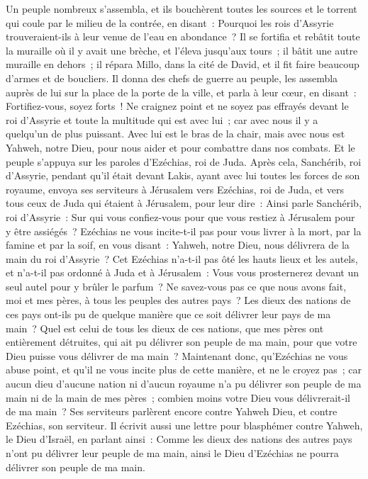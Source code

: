 \begin{multicols}{2}
Un peuple nombreux s'assembla, et ils bouchèrent toutes les sources et le torrent qui coule par le milieu de la contrée, en disant~: Pourquoi les rois d'Assyrie trouveraient-ils à leur venue de l'eau en abondance~?
Il se fortifia et rebâtit toute la muraille où il y avait une brèche, et l'éleva jusqu'aux tours~; il bâtit une autre muraille en dehors~; il répara Millo, dans la cité de David, et il fit faire beaucoup d'armes et de boucliers.
Il donna des chefs de guerre au peuple, les assembla auprès de lui sur la place de la porte de la ville, et parla à leur cœur, en disant~:
Fortifiez-vous, soyez forts~! Ne craignez point et ne soyez pas effrayés devant le roi d'Assyrie et toute la multitude qui est avec lui~; car avec nous il y a quelqu'un de plus puissant.
Avec lui est le bras de la chair, mais avec nous est Yahweh, notre Dieu, pour nous aider et pour combattre dans nos combats. Et le peuple s'appuya sur les paroles d'Ezéchias, roi de Juda.
Après cela, Sanchérib, roi d'Assyrie, pendant qu'il était devant Lakis, ayant avec lui toutes les forces de son royaume, envoya ses serviteurs à Jérusalem vers Ezéchias, roi de Juda, et vers tous ceux de Juda qui étaient à Jérusalem, pour leur dire~:
Ainsi parle Sanchérib, roi d'Assyrie~: Sur qui vous confiez-vous pour que vous restiez à Jérusalem pour y être assiégés~?
Ezéchias ne vous incite-t-il pas pour vous livrer à la mort, par la famine et par la soif, en vous disant~: Yahweh, notre Dieu, nous délivrera de la main du roi d'Assyrie~?
Cet Ezéchias n'a-t-il pas ôté les hauts lieux et les autels, et n'a-t-il pas ordonné à Juda et à Jérusalem~: Vous vous prosternerez devant un seul autel pour y brûler le parfum~?
Ne savez-vous pas ce que nous avons fait, moi et mes pères, à tous les peuples des autres pays~? Les dieux des nations de ces pays ont-ils pu de quelque manière que ce soit délivrer leur pays de ma main~?
Quel est celui de tous les dieux de ces nations, que mes pères ont entièrement détruites, qui ait pu délivrer son peuple de ma main, pour que votre Dieu puisse vous délivrer de ma main~?
Maintenant donc, qu'Ezéchias ne vous abuse point, et qu'il ne vous incite plus de cette manière, et ne le croyez pas~; car aucun dieu d'aucune nation ni d'aucun royaume n'a pu délivrer son peuple de ma main ni de la main de mes pères~; combien moins votre Dieu vous délivrerait-il de ma main~?
Ses serviteurs parlèrent encore contre Yahweh Dieu, et contre Ezéchias, son serviteur.
Il écrivit aussi une lettre pour blasphémer contre Yahweh, le Dieu d'Israël, en parlant ainsi~: Comme les dieux des nations des autres pays n'ont pu délivrer leur peuple de ma main, ainsi le Dieu d'Ezéchias ne pourra délivrer son peuple de ma main.

\end{multicols}
